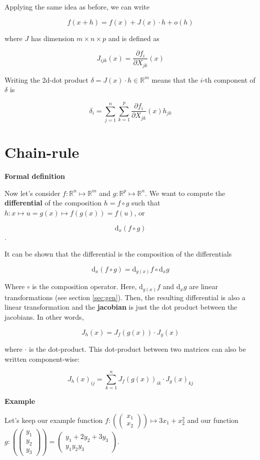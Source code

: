 \documentclass{tufte-handout}
\newcommand{\ud}{\mathrm{d}}
\begin{document}
Applying the same idea as before, we can write

$$ f(x + h) = f(x) + J(x) \cdot h + o(h) $$

where $ J $ has dimension $ m \times n \times p $ and is defined as

$$ J_{ijk}(x) = \frac{\partial f_i}{\partial X_{jk}} (x) $$

Writing the 2d-dot product $ \delta =  J(x) \cdot h \in \mathbb{R}^m $ means that the $i$-th component of $ \delta $ is

$$ \delta_i = \sum_{j=1}^n \sum_{k=1}^p \frac{\partial f_i}{\partial X_{jk}} (x) h_{jk} $$

\section{Chain-rule}

\textbf{Formal definition}

Now let's consider $ f: \mathbb{R}^n \mapsto \mathbb{R}^m $ and $ g: \mathbb{R}^p \mapsto \mathbb{R}^n $. We want to compute the \textbf{differential} of the composition $ h = f \circ g $ such that $ h :x \mapsto u = g(x) \mapsto f(g(x)) = f(u) $, or

$$ \ud_x (f \circ g) $$.

It can be shown that the differential is the composition of the differentials

$$ \ud_x (f \circ g) = \ud_{g(x)} f \circ \ud_x g $$

Where $ \circ $ is the composition operator. Here, $ \ud_{g(x)} f $ and $ \ud_x g $ are linear transformations (see section \ref{sec:gen}). Then, the resulting differential is also a linear transformation and the \textbf{jacobian} is just the dot product between the jacobians. In other words,


$$J_h(x) = J_f(g(x)) \cdot J_g(x) $$

where $ \cdot $ is the dot-product. This dot-product between two matrices can also be written component-wise:

$$ J_h(x)_{ij} = \sum_{k=1}^n J_f (g(x))_{ik} \cdot J_g(x)_{kj}$$

\textbf{Example}

Let's keep our example function $ f : (\begin{pmatrix}
x_1\\x_2
\end{pmatrix}) \mapsto 3x_1 + x_2^2 $ and our function
$ g : (\begin{pmatrix}
y_1\\y_2\\y_3
\end{pmatrix}) = \begin{pmatrix}
y_1 + 2y_2 + 3y_3\\ y_1y_2y_3
\end{pmatrix} $.
\end{document}
